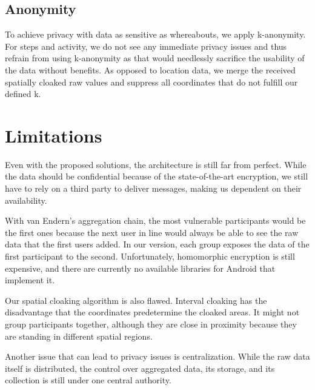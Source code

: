 \subsection{Anonymity}
To achieve privacy with data as sensitive as whereabouts, we apply k-anonymity. For steps and activity, we do not see any immediate privacy issues and thus refrain from using k-anonymity as that would needlessly sacrifice the usability of the data without benefits. As opposed to location data, we merge the received spatially cloaked raw values and suppress all coordinates that do not fulfill our defined k. 

\section{Limitations}
Even with the proposed solutions, the architecture is still far from perfect. While the data should be confidential because of the state-of-the-art encryption, we still have to rely on a third party to deliver messages, making us dependent on their availability.

With van Endern's aggregation chain, the most vulnerable participants would be the first ones because the next user in line would always be able to see the raw data that the first users added. In our version, each group exposes the data of the first participant to the second. Unfortunately, homomorphic encryption is still expensive, and there are currently no available libraries for Android that implement it.

Our spatial cloaking algorithm is also flawed. Interval cloaking has the disadvantage that the coordinates predetermine the cloaked areas. It might not group participants together, although they are close in proximity  because they are standing in different spatial regions.

Another issue that can lead to privacy issues is centralization. While the raw data itself is distributed, the control over aggregated data, its storage, and its collection is still under one central authority.